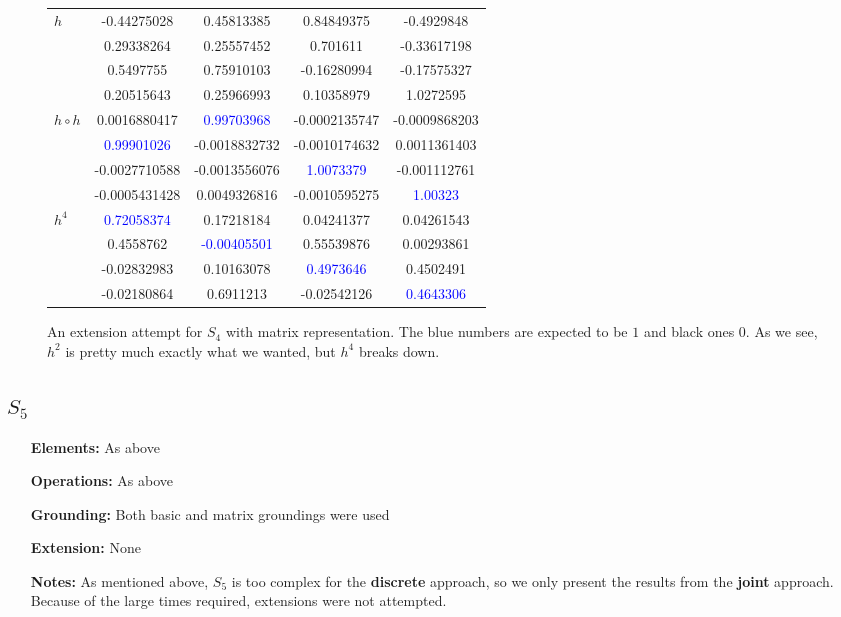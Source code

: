 \begin{figure}
\center
\caption{An extension attempt for $S_4$ with matrix representation. The blue numbers are expected to be $1$ and black ones $0$. As we see, $h^2$ is pretty much exactly what we wanted, but $h^4$ breaks down.}
\label{table:s4_matrix_half}
\begin{tabular}{lcccc}

$h$&-0.44275028 & 0.45813385 & 0.84849375 & -0.4929848\\
 &0.29338264 & 0.25557452 & 0.701611 & -0.33617198\\
 &0.5497755 & 0.75910103 & -0.16280994 & -0.17575327\\
 &0.20515643 & 0.25966993 & 0.10358979 & 1.0272595\\
 
 \hline
 
$h\circ h$&0.0016880417 & \textcolor{blue}{0.99703968} & -0.0002135747 & -0.0009868203\\
 &\textcolor{blue}{0.99901026} & -0.0018832732 & -0.0010174632 & 0.0011361403\\
 &-0.0027710588 & -0.0013556076 & \textcolor{blue}{1.0073379} & -0.001112761\\
 &-0.0005431428 & 0.0049326816 & -0.0010595275 & \textcolor{blue}{1.00323}\\
 
 \hline
 
 $h^4$&\textcolor{blue}{0.72058374} & 0.17218184	& 0.04241377 & 0.04261543\\
&0.4558762 & \textcolor{blue}{-0.00405501}	& 0.55539876 & 0.00293861\\
&-0.02832983 & 0.10163078 & \textcolor{blue}{0.4973646} & 0.4502491\\
&-0.02180864 & 0.6911213	& -0.02542126 &	\textcolor{blue}{0.4643306}

\end{tabular}

\end{figure}

\subsection{$S_5$}
\begin{itemize}
	\item[\textbf{Elements:}] As above
	\item[\textbf{Operations:}] As above
	\item[\textbf{Grounding:}] Both basic and matrix groundings were used
	\item[\textbf{Extension:}] None
	\item[\textbf{Notes:}] 
As mentioned above, $S_5$ is too complex for the \textbf{discrete} approach, so we only present the results from the \textbf{joint} approach. Because of the large times required, extensions were not attempted.
\end{itemize}

